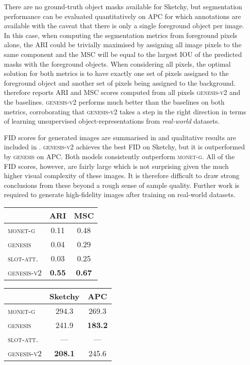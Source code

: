 \documentclass{article}
\begin{document}
There are no ground-truth object masks available for Sketchy, but segmentation performance can be evaluated quantitatively on APC for which annotations are available with the caveat that there is only a single foreground object per image.
In this case, when computing the segmentation metrics from foreground pixels alone, the ARI could be trivially maximised by assigning all image pixels to the same component and the MSC will be equal to the largest IOU of the predicted masks with the foreground objects.
When considering all pixels, the optimal solution for both metrics is to have exactly one set of pixels assigned to the foreground object and another set of pixels being assigned to the background.
 therefore reports ARI and MSC scores computed from all pixels \textsc{genesis-v2} and the baselines.
\textsc{genesis-v2} performs much better than the baselines on both metrics, corroborating that \textsc{genesis-v2} takes a step in the right direction in terms of learning unsupervised object-representations from \emph{real-world} datasets.

FID scores for generated images are summarised in  and qualitative results are included in .
\textsc{genesis-v2} achieves the best FID on Sketchy, but it is outperformed by \textsc{genesis} on APC.
Both models consistently outperform \textsc{monet-g}.
All of the FID scores, however, are fairly large which is not surprising given the much higher visual complexity of these images.
It is therefore difficult to draw strong conclusions from these beyond a rough sense of sample quality.
Further work is required to generate high-fidelity images after training on real-world datasets.

\begin{table*}
	\parbox{0.49\linewidth}{
	    \centering
    	\caption{Segmentation metrics on APC.}
    	\begin{tabular}{lcc}
    		\toprule
    		& ARI  & MSC \\
    		\midrule
    		\textsc{monet-g}     & 0.11 & 0.48 \\
    		\textsc{genesis}   & 0.04 & 0.29 \\
    		\textsc{slot-att.} & 0.03 & 0.25 \\
    		\textsc{genesis-v2} & \textbf{0.55} & \textbf{0.67} \\
    		\bottomrule
    	\end{tabular}
    	\label{tab:gpp:apc}
	}
	\parbox{0.49\linewidth}{
    	\centering
    	\caption{FID scores on Sketchy and APC.}
    	\begin{tabular}{lcc}
    		\toprule
    		& Sketchy & APC \\
    		\midrule
    		\textsc{monet-g}   & 294.3 & 269.3 \\
    		\textsc{genesis}   & 241.9 & \textbf{183.2} \\
    		\textsc{slot-att.} & --- & --- \\
    		\textsc{genesis-v2} & \textbf{208.1} & 245.6 \\
    		\bottomrule
    	\end{tabular}
    	\label{tab:gpp:fid}
	}
\end{table*}
\end{document}
